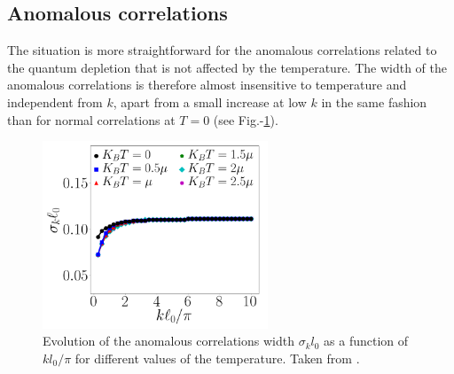 
\subsection{Anomalous correlations}

\label{sec:width_anomalous_theo}

The situation is more straightforward for the anomalous correlations related to the quantum depletion that is not affected by the temperature. The width of the anomalous correlations is therefore almost insensitive to temperature and independent from $k$, apart from a small increase at low $k$ in the same fashion than for normal correlations at $T=0$ (see Fig.-\ref{fig:butera_kmk}). 

\begin{figure}
    \centering
    \includegraphics[width=0.6\textwidth]{Fig/Chapter1/butera_kmk.png}
    \caption[Evolution of the anomalous correlations width with $k$ for different values of the temperature]{Evolution of the anomalous correlations width $\sigma_k l_0$ as a function of $k l_0/\pi$ for different values of the temperature. Taken from \cite{butera2020}.}
    \label{fig:butera_kmk}
\end{figure}


